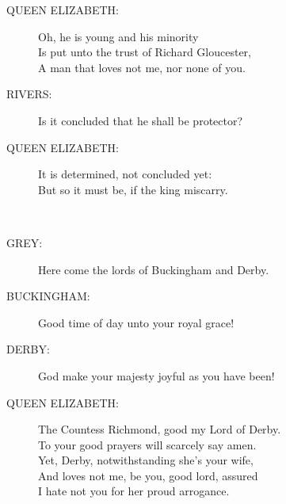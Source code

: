 \documentclass{article}
\begin{document}
\begin{description}
\item[QUEEN ELIZABETH:] 
\hspace{1pt}Oh, he is young and his minority\\
\hspace{1pt}Is put unto the trust of Richard Gloucester,\\
\hspace{1pt}A man that loves not me, nor none of you.\\
\end{description}
\begin{description}
\item[RIVERS:] 
\hspace{1pt}Is it concluded that he shall be protector?\\
\end{description}
\begin{description}
\item[QUEEN ELIZABETH:] 
\hspace{1pt}It is determined, not concluded yet:\\
\hspace{1pt}But so it must be, if the king miscarry.\\
\end{description}
\\
\begin{description}
\item[GREY:] 
\hspace{1pt}Here come the lords of Buckingham and Derby.\\
\end{description}
\begin{description}
\item[BUCKINGHAM:] 
\hspace{1pt}Good time of day unto your royal grace!\\
\end{description}
\begin{description}
\item[DERBY:] 
\hspace{1pt}God make your majesty joyful as you have been!\\
\end{description}
\begin{description}
\item[QUEEN ELIZABETH:] 
\hspace{1pt}The Countess Richmond, good my Lord of Derby.\\
\hspace{1pt}To your good prayers will scarcely say amen.\\
\hspace{1pt}Yet, Derby, notwithstanding she's your wife,\\
\hspace{1pt}And loves not me, be you, good lord, assured\\
\hspace{1pt}I hate not you for her proud arrogance.\\
\end{description}
\end{document}
